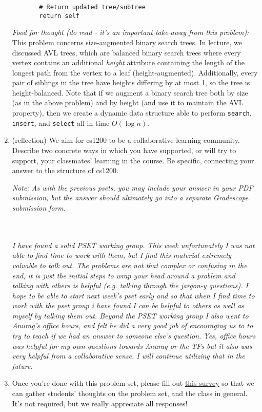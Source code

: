 \documentclass[11pt]{article}
\begin{document}
\begin{enumerate}
\begin{enumerate}
\begin{verbatim}
    # Return updated tree/subtree
    return self
\end{verbatim}
    
    \end{enumerate}
    
    \emph{Food for thought (do read - it's an important take-away from this problem):} This problem concerns size-augmented binary search trees. In lecture, we discussed AVL trees, which are balanced binary search trees where every vertex contains an additional \textit{height} attribute containing the length of the longest path from the vertex to a leaf (height-augmented). Additionally, every pair of siblings in the tree have heights differing by at most 1, so the tree is height-balanced. Note that if we augment a binary search tree both by size (as in the above problem) and by height (and use it to maintain the AVL property), then we create a dynamic data structure able to perform \texttt{search}, \texttt{insert}, and \texttt{select} all in time $O(\log n)$. 


\item (reflection) We aim for cs1200 to be a collaborative learning community. Describe two concrete ways in which you have supported, or will try to support, your classmates' learning in the course.  Be specific, connecting your answer to the structure of cs1200. 

\textit{Note: As with the previous psets, you may include your answer in your PDF submission, but the answer should ultimately go into a separate Gradescope submission form.}

\\\\ \textit{
    I have found a solid PSET working group. This week unfortunately I was not able to find time to work with them, but I find this material extremely valuable to talk out. The problems are not that complex or confusing in the end, it is just the initial steps to wrap your head around a problem and talking with others is helpful (e.g. talking through the jargon-y questions). I hope to be able to start next week's pset early and so that when I find time to work with the pset group i have found I can be helpful to others as well as myself by talking them out. Beyond the PSET working group I also went to Anurag's office hours, and felt he did a very good job of encouraging us to to try to teach if we had an answer to someone else's question. Yes, office hours was helpful for my own questions towards Anurag or the TFs but it also was very helpful from a collaborative sense. I will continue utilizing that in the future.
}

\item Once you're done with this problem set, please fill out \href{https://forms.gle/pyhGJ73HpodhThNP9}{this survey} so that we can gather students' thoughts on the problem set, and the class in general. It's not required, but we really appreciate all responses!

\end{enumerate}
\end{document}
